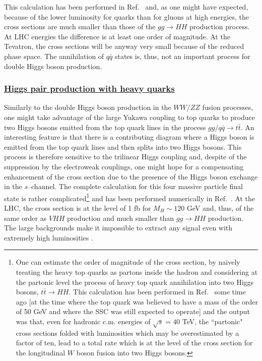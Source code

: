 This calculation has been performed in Ref.~\cite{pp-qqHH} and, as one might 
have expected, because of the lower luminosity for quarks than for gluons 
at high energies, the cross sections are much smaller than those of the $gg \to
HH$ production process. At LHC energies  the difference is at least one order 
of magnitude. At the Tevatron, the cross sections will be anyway very small
because of the reduced phase space.  The annihilation of $q\bar{q}$ states is, 
thus, not an important process for double Higgs boson production. 

\subsubsection*{\underline{Higgs pair production with heavy quarks}}

Similarly to the double Higgs boson production in the $WW/ZZ$ fusion processes,
one might take advantage of the large Yukawa coupling to top quarks to produce
two Higgs bosons emitted from the top quark lines in the process $gg/q\bar q
\to t\bar t$. An interesting feature is that there is a contributing diagram
where a Higgs boson is emitted from the top quark lines and then splits into
two Higgs bosons. This process is therefore sensitive to the trilinear Higgs
coupling and, despite of the suppression by the electroweak couplings,  one
might hope for a compensating  enhancement of the cross section due to the
presence of the Higgs boson exchange in the $s$--channel.
The complete calculation for this four massive particle final state is rather
complicated\footnote{One can estimate  the order of magnitude of the
cross section, by naively treating the heavy top quarks as partons inside the
hadron and considering at the partonic level the process  of heavy top quark
annihilation into two Higgs bosons, $t \bar{t} \to HH$. This calculation has
been performed in Ref.~\cite{pp-qqttHH0} some time ago [at the time where the
top quark was believed to have a mass of the order of 50 GeV and where the SSC
was still expected to operate] and the output was that, even for hadronic c.m.
energies of $\sqrt{s}= 40$ TeV, the ``partonic" cross sections folded with
luminosities which may be overestimated by a factor of ten, lead to a total
rate which is at the level of the cross section for the longitudinal $W$ boson
fusion  into two Higgs bosons.} and has been performed numerically in 
Ref.~\cite{pp-qqttHH}. At the LHC,
the cross section is at the level of 1 fb for $M_H \sim 120$ GeV and, thus, 
of the same order as $VHH$ production and much smaller than $gg \to HH$ 
production. The large backgrounds make it impossible to extract any signal
even with extremely high luminosities \cite{pp-qqttHH}. 


